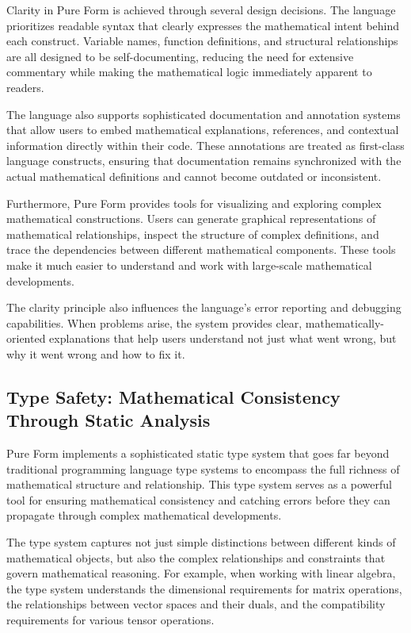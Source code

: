 Clarity in Pure Form is achieved through several design decisions.
The language prioritizes readable syntax that clearly expresses the mathematical intent behind each construct.
Variable names, function definitions, and structural relationships are all designed to be self-documenting, reducing the need for extensive commentary while making the mathematical logic immediately apparent to readers.

The language also supports sophisticated documentation and annotation systems that allow users to embed mathematical explanations, references, and contextual information directly within their code.
These annotations are treated as first-class language constructs, ensuring that documentation remains synchronized with the actual mathematical definitions and cannot become outdated or inconsistent.

Furthermore, Pure Form provides tools for visualizing and exploring complex mathematical constructions.
Users can generate graphical representations of mathematical relationships, inspect the structure of complex definitions, and trace the dependencies between different mathematical components.
These tools make it much easier to understand and work with large-scale mathematical developments.

The clarity principle also influences the language's error reporting and debugging capabilities.
When problems arise, the system provides clear, mathematically-oriented explanations that help users understand not just what went wrong, but why it went wrong and how to fix it.

\subsection{Type Safety: Mathematical Consistency Through Static Analysis}

Pure Form implements a sophisticated static type system that goes far beyond traditional programming language type systems to encompass the full richness of mathematical structure and relationship.
This type system serves as a powerful tool for ensuring mathematical consistency and catching errors before they can propagate through complex mathematical developments.

The type system captures not just simple distinctions between different kinds of mathematical objects, but also the complex relationships and constraints that govern mathematical reasoning.
For example, when working with linear algebra, the type system understands the dimensional requirements for matrix operations, the relationships between vector spaces and their duals, and the compatibility requirements for various tensor operations.

